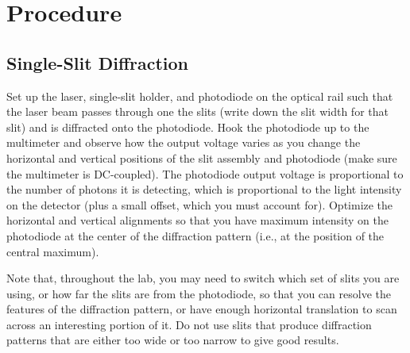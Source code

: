 \documentclass[]{manual}
\begin{document}
    \FloatBarrier
    \newpage

    \section{Procedure}

    \subsection{Single-Slit Diffraction}
    Set up the laser, single-slit holder, and photodiode on the optical rail such that the laser beam passes through one the slits (write down the slit width for that slit) and is diffracted onto the photodiode.
    Hook the photodiode up to the multimeter and observe how the output voltage varies as you change the horizontal and vertical positions of the slit assembly and photodiode (make sure the multimeter is DC-coupled).
    The photodiode output voltage is proportional to the number of photons it is detecting, which is proportional to the light intensity on the detector (plus a small offset, which you must account for).
    Optimize the horizontal and vertical alignments so that you have maximum intensity on the photodiode at the center of the diffraction pattern (i.e., at the position of the central maximum).
    
    Note that, throughout the lab, you may need to switch which set of slits you are using, or how far the slits are from the photodiode, so that you can resolve the features of the diffraction pattern, or have enough horizontal translation to scan across an interesting portion of it.
    Do not use slits that produce diffraction patterns that are either too wide or too narrow to give good results.

\end{document}
